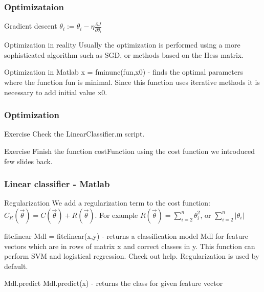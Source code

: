 \documentclass{beamer}
\begin{document}
\begin{frame}
\frametitle{Optimizataion}
\begin{block}{Gradient descent}
$\theta_i := \theta_i - \eta \frac{\partial J}{\partial \theta_i}$
\end{block}

\begin{block}{Optimization in reality}
Usually the optimization is performed using a more sophisticated algorithm such as SGD, or methods based on the Hess matrix.
\end{block}

\begin{block}{Optimization in Matlab}
x = fminunc(fun,x0) - finds the optimal parameters where the function fun is minimal. Since this function uses iterative methods it is necessary to add initial value x0.
\end{block}
\end{frame}

\begin{frame}
\frametitle{Optimization}
\begin{block}{Exercise}
Check the LinearClassifier.m script.
\end{block}

\begin{block}{Exercise}
Finish the function costFunction using the cost function we introduced few slides back.
\end{block}
\end{frame}



\begin{frame}
\frametitle{Linear classifier - Matlab}
\begin{block}{Regularization}
We add a regularization term to the cost function: $C_R(\vec{\theta}) = C(\vec{\theta}) + R(\vec{\theta})$. For example $R(\vec{\theta}) = \sum_{i=2}^n \theta_i^2$, or $\sum_{i=2}^n |\theta_i |$
\end{block}


\begin{block}{fitclinear}
Mdl = fitclinear(x,y) - returns a classification model Mdl for feature vectors which are in rows of matrix x and correct classes in y. This function can perform SVM and logistical regression. Check out help. Regularization is used by default.
\end{block}

\begin{block}{Mdl.predict}
Mdl.predict(x) - returns the class for given feature vector
\end{block}
\end{frame}
\end{document}
